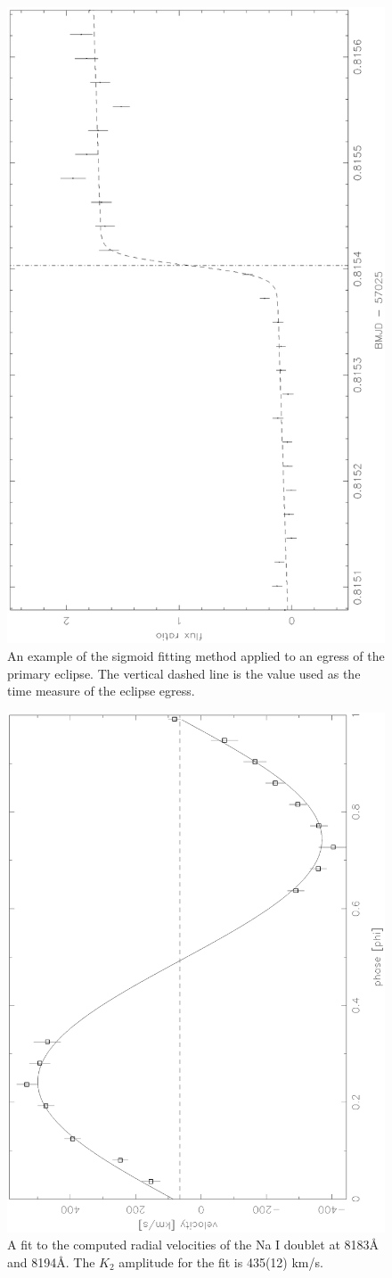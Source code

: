 \documentclass[a4paper,fleqn,usenatbib]{mnras}
\begin{document}
\begin{figure}
\centering
\includegraphics[height=\columnwidth, angle=270]{images/egress.eps}
\caption[Caption for egress]{An example of the sigmoid fitting method applied to an egress of the primary eclipse. The vertical dashed line is the value used as the time measure of the eclipse egress.}
\label{fig:egress}
\end{figure}


\begin{figure}
\centering
\includegraphics[height=\columnwidth, angle=270]{images/NaIrvfit.eps}
\caption[Caption for RVs]{A fit to the computed radial velocities of the Na I doublet at 8183\AA~ and 8194\AA. The $K_2$ amplitude for the fit is 435(12) km/s.     }
\label{fig:rv-fit}
\end{figure}
\end{document}

